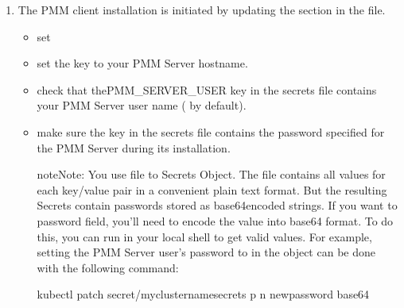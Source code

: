 \documentclass[letterpaper,10pt,english]{sphinxmanual}
\begin{document}
\begin{enumerate}
%
\item {} 
The PMM client installation is initiated by updating the 
section in the
file.
\begin{itemize}
\item {} 
set 

\item {} 
set the  key to your PMM Server hostname.

\item {} 
check that  the\textasciigrave{}\textasciigrave{}PMM\_SERVER\_USER\textasciigrave{}\textasciigrave{} key in the
secrets file contains your PMM Server user name ( by default).

\item {} 
make sure the  key in the
secrets file contains the password specified for the PMM Server during its
installation.

\begin{sphinxadmonition}{note}{Note:}
You use  file to  Secrets Object.
The file contains all values for each key/value pair in a convenient
plain text format. But the resulting Secrets contain passwords stored
as base64\sphinxhyphen{}encoded strings. If you want to  password field,
you’ll need to encode the value into base64 format. To do this, you can
run  in your local shell to get valid
values. For example, setting the PMM Server user’s password to
 in the  object can be done
with the following command:

\begin{sphinxVerbatim}[commandchars=\\\{\}]
kubectl patch secret/my\PYGZhy{}cluster\PYGZhy{}name\PYGZhy{}secrets \PYGZhy{}p  \PYGZhy{}n new\PYGZus{}password  base64
\end{sphinxVerbatim}
\end{sphinxadmonition}


\end{itemize}
\end{enumerate}
\end{document}
